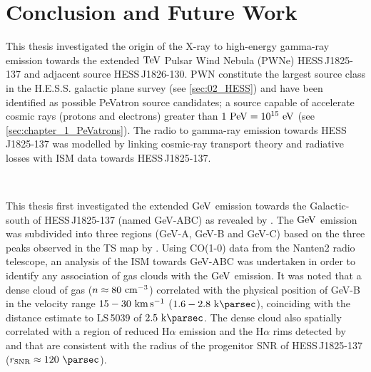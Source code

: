 \chapter{Conclusion and Future Work} \label{sec:10_summary}

This thesis investigated the origin of the X-ray to high-energy gamma-ray emission towards the extended $\TeV$ Pulsar Wind Nebula (PWNe) \mbox{HESS\,J1825-137} and adjacent source \mbox{HESS\,J1826-130}. PWN constitute the largest source class in the H.E.S.S. galactic plane survey (see \autoref{sec:02_HESS}) and have been identified as possible PeVatron source candidates; a source capable of accelerate cosmic rays (protons and electrons) greater than $1~\PeV=10^{15}~\eV$ (see \autoref{sec:chapter_1_PeVatrons}). The radio to gamma-ray emission towards \mbox{HESS\,J1825-137} was modelled by linking cosmic-ray transport theory and radiative losses with ISM data towards \mbox{HESS\,J1825-137}.
\par~\par
This thesis first investigated the extended $\si{\giga\electronvolt}$ emission towards the Galactic-south of \mbox{HESS\,J1825-137} (named GeV-ABC) as revealed by \cite{2019MNRAS.485.1001A}. The $\si{\giga\electronvolt}$ emission was subdivided into three regions (GeV-A, GeV-B and GeV-C) based on the three peaks observed in the TS map by \cite{2019MNRAS.485.1001A}. Using CO(1-0) data from the Nanten2 radio telescope, an analysis of the ISM towards GeV-ABC was undertaken in order to identify any association of gas clouds with the $\si{\giga\electronvolt}$ emission. It was noted that a dense cloud of gas ($n\approx 80~\si{\per\centi\meter\cubed}$) correlated with the physical position of GeV-B in the velocity range $15-30~\si{\kilo\meter\per\second}$ ($1.6-2.8~\kpc$), coinciding with the distance estimate to \mbox{LS\,5039} of $2.5~\kpc$. The dense cloud also spatially correlated with a region of reduced H$\alpha$ emission and the H$\alpha$ rims detected by \cite{2008MNRAS.390.1037S} and \cite{2016MNRAS.458.2813V} that are consistent with the radius of the progenitor SNR of \mbox{HESS\,J1825-137} ($r_\text{SNR}\approx 120~\pc$).
\par~\par
